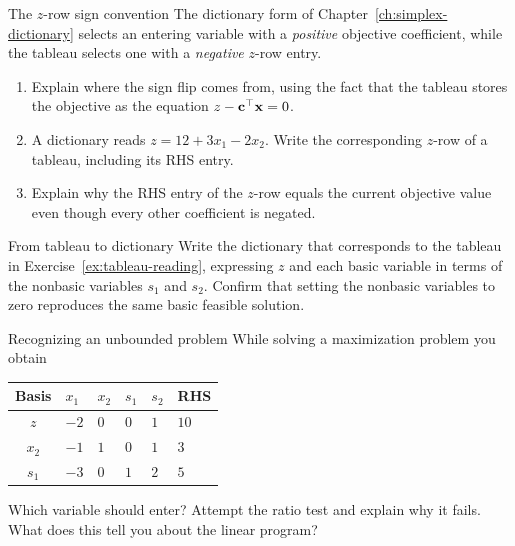 
\begin{ex}{The $z$-row sign convention}{}
\label{ex:tableau-sign-convention}
 The dictionary form of Chapter~\ref{ch:simplex-dictionary} selects an entering variable with a \emph{positive} objective coefficient, while the tableau selects one with a \emph{negative} $z$-row entry.
\begin{enumerate}
    \item Explain where the sign flip comes from, using the fact that the tableau stores the objective as the equation $z - \mathbf{c}^\top\mathbf{x} = 0$.
    \item A dictionary reads $z = 12 + 3x_1 - 2x_2$.  Write the corresponding $z$-row of a tableau, including its RHS entry.
    \item Explain why the RHS entry of the $z$-row equals the current objective value even though every other coefficient is negated.
\end{enumerate}
\end{ex}

\begin{ex}{From tableau to dictionary}{}
\label{ex:tableau-to-dictionary}
 Write the dictionary that corresponds to the tableau in Exercise~\ref{ex:tableau-reading}, expressing $z$ and each basic variable in terms of the nonbasic variables $s_1$ and $s_2$. Confirm that setting the nonbasic variables to zero reproduces the same basic feasible solution.
\end{ex}

\begin{ex}{Recognizing an unbounded problem}{}
\label{ex:tableau-unbounded}
 While solving a maximization problem you obtain
\begin{center}
\renewcommand{\arraystretch}{1.3}
\begin{tabular}{c|ZZZZ|Z}
\toprule
Basis & $x_1$ & $x_2$ & $s_1$ & $s_2$ & RHS\\
\midrule
$z$   & $-2$ & $0$ & $0$ & $1$ & $10$\\
\midrule
$x_2$ & $-1$ & $1$ & $0$ & $1$ & $3$\\
$s_1$ & $-3$ & $0$ & $1$ & $2$ & $5$\\
\bottomrule
\end{tabular}
\end{center}
Which variable should enter? Attempt the ratio test and explain why it fails. What does this tell you about the linear program?
\end{ex}

